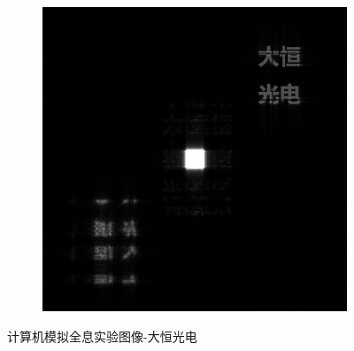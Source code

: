 \documentclass{ctexart}
\begin{document}
\begin{figure}[H]
\begin{subfigure}{.32\textwidth}
  \end{subfigure}
  \begin{subfigure}{.32\textwidth}
    \includegraphics[width=\linewidth]{数字全息实验数据/计算机模拟全息/用软件重建的结果图像/2-大恒光电-重建.jpg}
  \end{subfigure}
  \caption{计算机模拟全息实验图像-大恒光电}
\end{figure}
\end{document}
